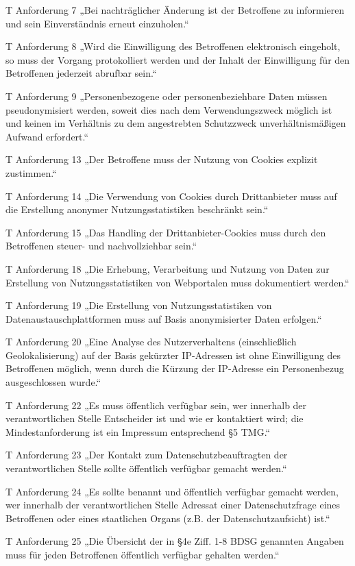 T Anforderung 7
„Bei nachträglicher Änderung ist der Betroffene zu informieren und sein Einverständnis erneut einzuholen.“

T Anforderung 8
„Wird die Einwilligung des Betroffenen elektronisch eingeholt, so muss der Vorgang protokolliert werden und der Inhalt der Einwilligung für den Betroffenen jederzeit abrufbar sein.“

T Anforderung 9
„Personenbezogene oder personenbeziehbare Daten müssen pseudonymisiert werden, soweit dies nach dem Verwendungszweck möglich ist und keinen im Verhältnis zu dem angestrebten Schutzzweck unverhältnismäßigen Aufwand erfordert.“

T Anforderung 13
„Der Betroffene muss der Nutzung von Cookies explizit zustimmen.“

T Anforderung 14
„Die Verwendung von Cookies durch Drittanbieter muss auf die Erstellung anonymer Nutzungsstatistiken beschränkt sein.“

T Anforderung 15
„Das Handling der Drittanbieter-Cookies muss durch den Betroffenen steuer- und nachvollziehbar sein.“

T Anforderung 18
„Die Erhebung, Verarbeitung und Nutzung von Daten zur Erstellung von Nutzungsstatistiken von Webportalen muss dokumentiert werden.“

T Anforderung 19
„Die Erstellung von Nutzungsstatistiken von Datenaustauschplattformen muss auf Basis anonymisierter Daten erfolgen.“

T Anforderung 20
„Eine Analyse des Nutzerverhaltens (einschließlich Geolokalisierung) auf der Basis gekürzter IP-Adressen ist ohne Einwilligung des Betroffenen möglich, wenn durch die Kürzung der IP-Adresse ein Personenbezug ausgeschlossen wurde.“

T Anforderung 22
„Es muss öffentlich verfügbar sein, wer innerhalb der verantwortlichen Stelle Entscheider ist und wie er kontaktiert wird; die Mindestanforderung ist ein Impressum entsprechend §5 TMG.“

T Anforderung 23
„Der Kontakt zum Datenschutzbeauftragten der verantwortlichen Stelle sollte öffentlich verfügbar gemacht werden.“

T Anforderung 24
„Es sollte benannt und öffentlich verfügbar gemacht werden, wer innerhalb der verantwortlichen Stelle Adressat einer Datenschutzfrage eines Betroffenen oder eines staatlichen Organs (z.B. der Datenschutzaufsicht) ist.“

T Anforderung 25
„Die Übersicht der in §4e Ziff. 1-8 BDSG genannten Angaben muss für jeden Betroffenen öffentlich verfügbar gehalten werden.“

